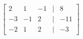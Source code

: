 \documentclass[preview]{standalone}
\begin{document}
\begin{align*}
\begin{bmatrix} 2 & 1 & -1 & | & 8 \\ -3 & -1 & 2 & | & -11 \\ -2 & 1 & 2 & | & -3 \end{bmatrix}
\end{align*}
\end{document}
